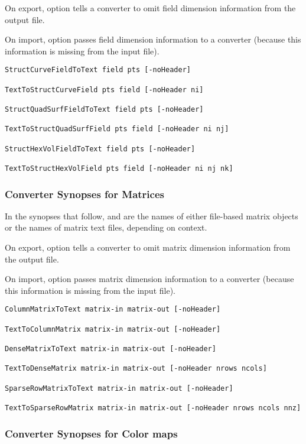 On export, option  tells a converter to omit
field dimension information from the output file.

On import, option  passes field dimension
information to a converter (because this information is missing from
the input file).

\begin{verbatim}
StructCurveFieldToText field pts [-noHeader]

TextToStructCurveField pts field [-noHeader ni]

StructQuadSurfFieldToText field pts [-noHeader]

TextToStructQuadSurfField pts field [-noHeader ni nj]

StructHexVolFieldToText field pts [-noHeader]

TextToStructHexVolField pts field [-noHeader ni nj nk]

\end{verbatim}

\subsubsection{Converter Synopses for Matrices}

In the synopses that follow,  and 
are the names of either \sr{} file-based matrix objects or the names
of matrix text files, depending on context.

On export, option  tells a converter to omit matrix
dimension information from the output file.

On import, option  passes matrix dimension
information to a converter (because this information is missing from
the input file).

\begin{verbatim}
ColumnMatrixToText matrix-in matrix-out [-noHeader]

TextToColumnMatrix matrix-in matrix-out [-noHeader]

DenseMatrixToText matrix-in matrix-out [-noHeader]

TextToDenseMatrix matrix-in matrix-out [-noHeader nrows ncols]

SparseRowMatrixToText matrix-in matrix-out [-noHeader]

TextToSparseRowMatrix matrix-in matrix-out [-noHeader nrows ncols nnz]
\end{verbatim}

\subsubsection{Converter Synopses for Color maps}

